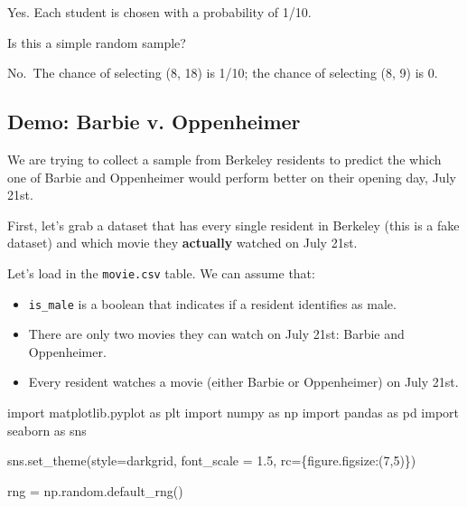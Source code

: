 \documentclass[
  letterpaper,
  DIV=11,
  numbers=noendperiod]{scrreprt}
\newenvironment{Shaded}{\begin{snugshade}}{\end{snugshade}}
\newcommand{\DecValTok}[1]{\textcolor[rgb]{0.68,0.00,0.00}{#1}}
\newcommand{\FloatTok}[1]{\textcolor[rgb]{0.68,0.00,0.00}{#1}}
\newcommand{\ImportTok}[1]{\textcolor[rgb]{0.00,0.46,0.62}{#1}}
\newcommand{\NormalTok}[1]{\textcolor[rgb]{0.00,0.23,0.31}{#1}}
\newcommand{\OperatorTok}[1]{\textcolor[rgb]{0.37,0.37,0.37}{#1}}
\newcommand{\StringTok}[1]{\textcolor[rgb]{0.13,0.47,0.30}{#1}}
\providecommand{\tightlist}{%
  \setlength{\itemsep}{0pt}\setlength{\parskip}{0pt}}\usepackage{longtable,booktabs,array}
\begin{document}
Yes. Each student is chosen with a probability of 1/10.

Is this a simple random sample?

No.~The chance of selecting (8, 18) is 1/10; the chance of selecting (8,
9) is 0.

\subsection{Demo: Barbie v.
Oppenheimer}\label{demo-barbie-v.-oppenheimer}

We are trying to collect a sample from Berkeley residents to predict the
which one of Barbie and Oppenheimer would perform better on their
opening day, July 21st.

First, let's grab a dataset that has every single resident in Berkeley
(this is a fake dataset) and which movie they \textbf{actually} watched
on July 21st.

Let's load in the \texttt{movie.csv} table. We can assume that:

\begin{itemize}
\tightlist
\item
  \texttt{is\_male} is a boolean that indicates if a resident identifies
  as male.
\item
  There are only two movies they can watch on July 21st: Barbie and
  Oppenheimer.
\item
  Every resident watches a movie (either Barbie or Oppenheimer) on July
  21st.
\end{itemize}

\begin{Shaded}
\begin{Highlighting}[]
\ImportTok{import}\NormalTok{ matplotlib.pyplot }\ImportTok{as}\NormalTok{ plt}
\ImportTok{import}\NormalTok{ numpy }\ImportTok{as}\NormalTok{ np}
\ImportTok{import}\NormalTok{ pandas }\ImportTok{as}\NormalTok{ pd}
\ImportTok{import}\NormalTok{ seaborn }\ImportTok{as}\NormalTok{ sns}

\NormalTok{sns.set\_theme(style}\OperatorTok{=}\StringTok{\textquotesingle{}darkgrid\textquotesingle{}}\NormalTok{, font\_scale }\OperatorTok{=} \FloatTok{1.5}\NormalTok{,}
\NormalTok{              rc}\OperatorTok{=}\NormalTok{\{}\StringTok{\textquotesingle{}figure.figsize\textquotesingle{}}\NormalTok{:(}\DecValTok{7}\NormalTok{,}\DecValTok{5}\NormalTok{)\})}

\NormalTok{rng }\OperatorTok{=}\NormalTok{ np.random.default\_rng()}
\end{Highlighting}
\end{Shaded}
\end{document}
